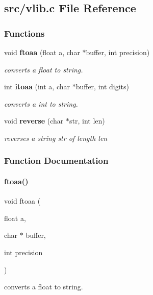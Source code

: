\subsection{src/vlib.c File Reference}
\label{vlib_8c}
\subsubsection*{Functions}
\begin{DoxyCompactItemize}
\item 
void \textbf{ ftoaa} (float a, char $\ast$buffer, int precision)
\begin{DoxyCompactList}\small\item\em converts a float to string. \end{DoxyCompactList}\item 
int \textbf{ itoaa} (int a, char $\ast$buffer, int digits)
\begin{DoxyCompactList}\small\item\em converts a int to string. \end{DoxyCompactList}\item 
void \textbf{ reverse} (char $\ast$str, int len)
\begin{DoxyCompactList}\small\item\em reverses a string \textquotesingle{}str\textquotesingle{} of length \textquotesingle{}len\textquotesingle{} \end{DoxyCompactList}\end{DoxyCompactItemize}


\subsubsection{Function Documentation}
\mbox{\label{vlib_8c_a4d26b0ac2f26341d827e0a13a0bd49b6}} 
\paragraph{ftoaa()}
{\footnotesize\ttfamily void ftoaa (\begin{DoxyParamCaption}\item[{float}]{a,  }\item[{char $\ast$}]{buffer,  }\item[{int}]{precision }\end{DoxyParamCaption})}



converts a float to string. 


